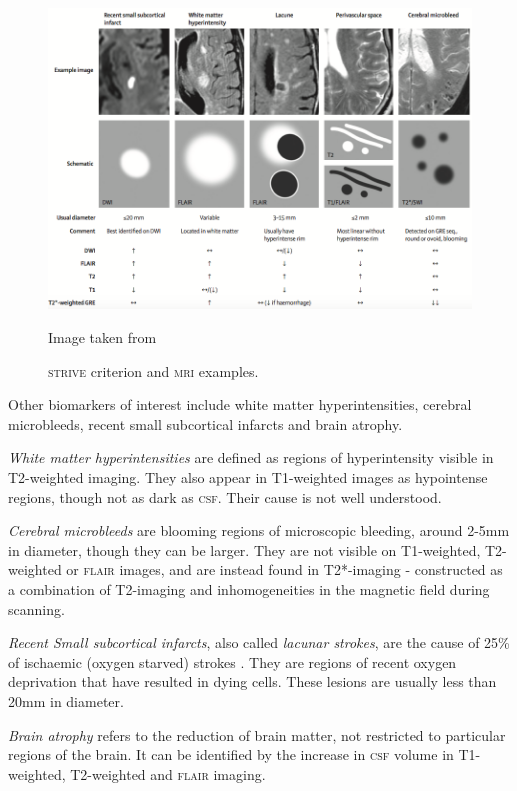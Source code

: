 \begin{figure}[ht]
	\centering
	\includegraphics[width = \textwidth]{Images/2_STRIVE.png}
	\caption{\textsc{strive} criterion and \textsc{mri} examples.}
	\small Image taken from \cite{WardlawJ.M.2013Nsfr}
\end{figure}

Other biomarkers of interest include white matter hyperintensities, cerebral microbleeds, recent small subcortical infarcts and brain atrophy. 

\textit{White matter hyperintensities} are defined as regions of hyperintensity visible in T2-weighted imaging. They also appear in T1-weighted images as hypointense regions, though not as dark as \textsc{csf}. Their cause is not well understood.

\textit{Cerebral microbleeds} are blooming regions of microscopic bleeding, around 2-5mm in diameter, though they can be larger. They are not visible on T1-weighted, T2-weighted or \textsc{flair} images, and are instead found in T2*-imaging - constructed as a combination of T2-imaging and inhomogeneities in the magnetic field during scanning. 

\textit{Recent Small subcortical infarcts}, also called \textit{lacunar strokes}, are the cause of 25\% of ischaemic (oxygen starved) strokes \cite{WardlawJ.M.2013Nsfr}. They are regions of recent oxygen deprivation that have resulted in dying cells. These lesions are usually less than 20mm in diameter. 

\textit{Brain atrophy} refers to the reduction of brain matter, not restricted to particular regions of the brain. It can be identified by the increase in \textsc{csf} volume in T1-weighted, T2-weighted and \textsc{flair} imaging.

